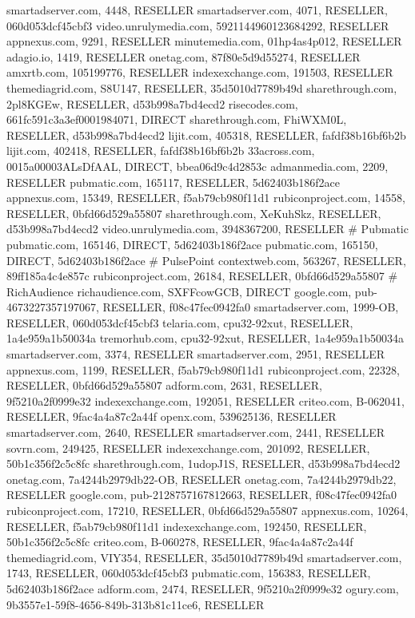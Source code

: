 smartadserver.com, 4448, RESELLER
smartadserver.com, 4071, RESELLER, 060d053dcf45cbf3
video.unrulymedia.com, 5921144960123684292, RESELLER
appnexus.com, 9291, RESELLER
minutemedia.com, 01hp4as4p012, RESELLER
adagio.io, 1419, RESELLER
onetag.com, 87f80e5d9d55274, RESELLER
amxrtb.com, 105199776, RESELLER
indexexchange.com, 191503, RESELLER
themediagrid.com, S8U147, RESELLER, 35d5010d7789b49d
sharethrough.com, 2pl8KGEw, RESELLER, d53b998a7bd4ecd2
risecodes.com, 661fc591c3a3ef0001984071, DIRECT
sharethrough.com, FhiWXM0L, RESELLER, d53b998a7bd4ecd2
lijit.com, 405318, RESELLER, fafdf38b16bf6b2b
lijit.com, 402418, RESELLER, fafdf38b16bf6b2b
33across.com, 0015a00003ALsDfAAL, DIRECT, bbea06d9c4d2853c
admanmedia.com, 2209, RESELLER
pubmatic.com, 165117, RESELLER, 5d62403b186f2ace
appnexus.com, 15349, RESELLER, f5ab79cb980f11d1
rubiconproject.com, 14558, RESELLER, 0bfd66d529a55807
sharethrough.com, XeKuhSkz, RESELLER, d53b998a7bd4ecd2
video.unrulymedia.com, 3948367200, RESELLER
# Pubmatic
pubmatic.com, 165146, DIRECT, 5d62403b186f2ace
pubmatic.com, 165150, DIRECT, 5d62403b186f2ace
# PulsePoint
contextweb.com, 563267, RESELLER, 89ff185a4c4e857c
rubiconproject.com, 26184, RESELLER, 0bfd66d529a55807
# RichAudience
richaudience.com, SXFFcowGCB, DIRECT
google.com, pub-4673227357197067, RESELLER, f08c47fec0942fa0
smartadserver.com, 1999-OB, RESELLER, 060d053dcf45cbf3
telaria.com, cpu32-92xut, RESELLER, 1a4e959a1b50034a
tremorhub.com, cpu32-92xut, RESELLER, 1a4e959a1b50034a
smartadserver.com, 3374, RESELLER
smartadserver.com, 2951, RESELLER
appnexus.com, 1199, RESELLER, f5ab79cb980f11d1
rubiconproject.com, 22328, RESELLER, 0bfd66d529a55807
adform.com, 2631, RESELLER, 9f5210a2f0999e32
indexexchange.com, 192051, RESELLER
criteo.com, B-062041, RESELLER, 9fac4a4a87c2a44f
openx.com, 539625136, RESELLER
smartadserver.com, 2640, RESELLER
smartadserver.com, 2441, RESELLER
sovrn.com, 249425, RESELLER
indexexchange.com, 201092, RESELLER, 50b1c356f2c5c8fc
sharethrough.com, 1udopJ1S, RESELLER, d53b998a7bd4ecd2
onetag.com, 7a4244b2979db22-OB, RESELLER
onetag.com, 7a4244b2979db22, RESELLER
google.com, pub-2128757167812663, RESELLER, f08c47fec0942fa0
rubiconproject.com, 17210, RESELLER, 0bfd66d529a55807
appnexus.com, 10264, RESELLER, f5ab79cb980f11d1
indexexchange.com, 192450, RESELLER, 50b1c356f2c5c8fc
criteo.com, B-060278, RESELLER, 9fac4a4a87c2a44f
themediagrid.com, VIY354, RESELLER, 35d5010d7789b49d
smartadserver.com, 1743, RESELLER, 060d053dcf45cbf3
pubmatic.com, 156383, RESELLER, 5d62403b186f2ace
adform.com, 2474, RESELLER, 9f5210a2f0999e32
ogury.com, 9b3557e1-59f8-4656-849b-313b81c11ce6, RESELLER
